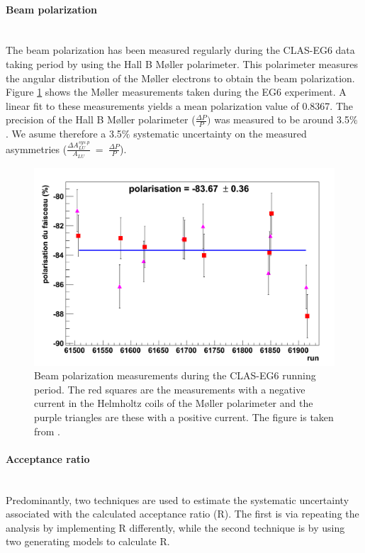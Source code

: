 \paragraph{Beam polarization} ~\\
The beam polarization has been measured regularly during the CLAS-EG6 data 
taking period by using the Hall B M\o ller polarimeter. This polarimeter 
measures the angular distribution of the M\o ller electrons to obtain the beam 
polarization. Figure \ref{fig:beam_polarization} shows the M\o ller 
measurements taken during the EG6 experiment. A linear fit to these 
measurements yields a mean polarization value of 0.8367. The precision of the 
Hall B M\o ller polarimeter ($\frac{\Delta P}{P})$ was measured to be around 
3.5$\%$ \cite{hallb_polarimeter}. We asume therefore a 3.5$\%$ systematic 
uncertainty on the measured asymmetries ($\frac{\Delta A^{sys.  
p}_{LU}}{A_{LU}}$~=~$\frac{\Delta P}{P}$).

\begin{figure}[tp]
\centering
\includegraphics[scale=0.25]{fig_dvcs/beam_polarization.png}
\caption{Beam polarization measurements during the CLAS-EG6 running period.  
The red squares are the measurements with a negative current in the Helmholtz 
coils of the M\o ller polarimeter and the purple triangles are these with a 
positive current. The figure is taken from \cite{yohann}.} 
\label{fig:beam_polarization}
\end{figure}


\paragraph{Acceptance ratio} ~\\
Predominantly, two techniques are used to estimate the systematic uncertainty 
associated with the calculated acceptance ratio (R). The first is via repeating 
the analysis by implementing R differently, while the second technique is by 
using two generating models to calculate R.

